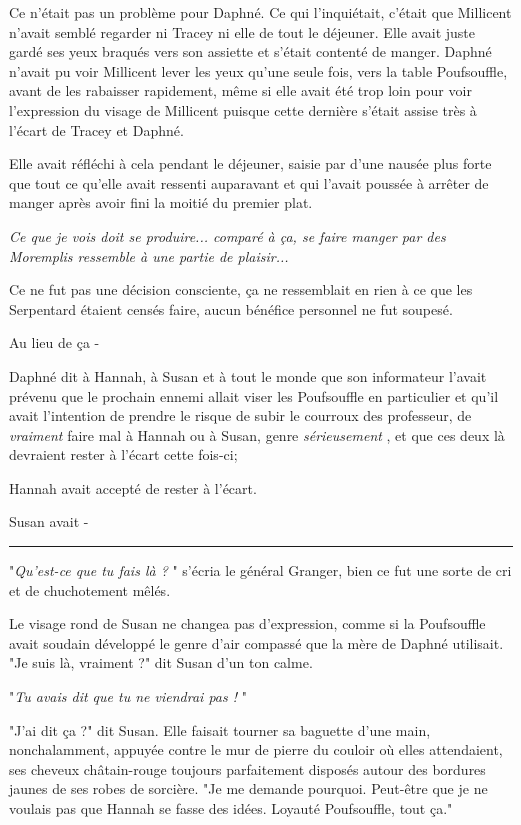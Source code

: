 Ce n'était pas un problème pour Daphné. Ce qui l'inquiétait, c'était que Millicent n'avait semblé regarder ni Tracey ni elle de tout le déjeuner. Elle avait juste gardé ses yeux braqués vers son assiette et s'était contenté de manger. Daphné n'avait pu voir Millicent lever les yeux qu'une seule fois, vers la table Poufsouffle, avant de les rabaisser rapidement, même si elle avait été trop loin pour voir l'expression du visage de Millicent puisque cette dernière s'était assise très à l'écart de Tracey et Daphné.

Elle avait réfléchi à cela pendant le déjeuner, saisie par d'une nausée plus forte que tout ce qu'elle avait ressenti auparavant et qui l'avait poussée à arrêter de manger après avoir fini la moitié du premier plat.

\emph{Ce que je vois doit se produire... comparé à ça, se faire manger par des Moremplis ressemble à une partie de plaisir...} 

Ce ne fut pas une décision consciente, ça ne ressemblait en rien à ce que les Serpentard étaient censés faire, aucun bénéfice personnel ne fut soupesé.

Au lieu de ça -

Daphné dit à Hannah, à Susan et à tout le monde que son informateur l'avait prévenu que le prochain ennemi allait viser les Poufsouffle en particulier et qu'il avait l'intention de prendre le risque de subir le courroux des professeur, de \emph{vraiment}  faire mal à Hannah ou à Susan, genre \emph{sérieusement} , et que ces deux là devraient rester à l'écart cette fois-ci;

Hannah avait accepté de rester à l'écart.

Susan avait -
\par\noindent\rule{\textwidth}{0.4pt}
"\emph{Qu'est-ce que tu fais là ?} " s'écria le général Granger, bien ce fut une sorte de cri et de chuchotement mêlés.

Le visage rond de Susan ne changea pas d'expression, comme si la Poufsouffle avait soudain développé le genre d'air compassé que la mère de Daphné utilisait. "Je suis là, vraiment ?" dit Susan d'un ton calme.

"\emph{Tu avais dit que tu ne viendrai pas !} "

"J'ai dit ça ?" dit Susan. Elle faisait tourner sa baguette d'une main, nonchalamment, appuyée contre le mur de pierre du couloir où elles attendaient, ses cheveux châtain-rouge toujours parfaitement disposés autour des bordures jaunes de ses robes de sorcière. "Je me demande pourquoi. Peut-être que je ne voulais pas que Hannah se fasse des idées. Loyauté Poufsouffle, tout ça."

